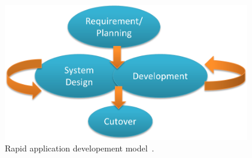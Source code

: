 
\begin{figure}[H]
	\centering
    \includegraphics[height=6cm]{images/design/rad}
    \caption[Rapid application developement]{Rapid application developement model~\protect\footnotemark.}
    \label{fig:rad}
\end{figure}

